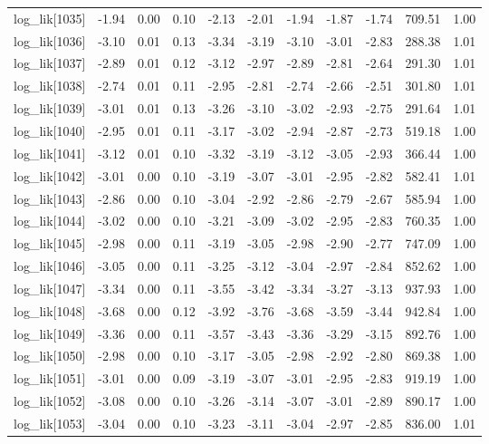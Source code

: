 \begin{table}[ht]
\begin{tabular}{rrrrrrrrrrr}
  log\_lik[1035] & -1.94 & 0.00 & 0.10 & -2.13 & -2.01 & -1.94 & -1.87 & -1.74 & 709.51 & 1.00 \\ 
  log\_lik[1036] & -3.10 & 0.01 & 0.13 & -3.34 & -3.19 & -3.10 & -3.01 & -2.83 & 288.38 & 1.01 \\ 
  log\_lik[1037] & -2.89 & 0.01 & 0.12 & -3.12 & -2.97 & -2.89 & -2.81 & -2.64 & 291.30 & 1.01 \\ 
  log\_lik[1038] & -2.74 & 0.01 & 0.11 & -2.95 & -2.81 & -2.74 & -2.66 & -2.51 & 301.80 & 1.01 \\ 
  log\_lik[1039] & -3.01 & 0.01 & 0.13 & -3.26 & -3.10 & -3.02 & -2.93 & -2.75 & 291.64 & 1.01 \\ 
  log\_lik[1040] & -2.95 & 0.01 & 0.11 & -3.17 & -3.02 & -2.94 & -2.87 & -2.73 & 519.18 & 1.00 \\ 
  log\_lik[1041] & -3.12 & 0.01 & 0.10 & -3.32 & -3.19 & -3.12 & -3.05 & -2.93 & 366.44 & 1.00 \\ 
  log\_lik[1042] & -3.01 & 0.00 & 0.10 & -3.19 & -3.07 & -3.01 & -2.95 & -2.82 & 582.41 & 1.01 \\ 
  log\_lik[1043] & -2.86 & 0.00 & 0.10 & -3.04 & -2.92 & -2.86 & -2.79 & -2.67 & 585.94 & 1.00 \\ 
  log\_lik[1044] & -3.02 & 0.00 & 0.10 & -3.21 & -3.09 & -3.02 & -2.95 & -2.83 & 760.35 & 1.00 \\ 
  log\_lik[1045] & -2.98 & 0.00 & 0.11 & -3.19 & -3.05 & -2.98 & -2.90 & -2.77 & 747.09 & 1.00 \\ 
  log\_lik[1046] & -3.05 & 0.00 & 0.11 & -3.25 & -3.12 & -3.04 & -2.97 & -2.84 & 852.62 & 1.00 \\ 
  log\_lik[1047] & -3.34 & 0.00 & 0.11 & -3.55 & -3.42 & -3.34 & -3.27 & -3.13 & 937.93 & 1.00 \\ 
  log\_lik[1048] & -3.68 & 0.00 & 0.12 & -3.92 & -3.76 & -3.68 & -3.59 & -3.44 & 942.84 & 1.00 \\ 
  log\_lik[1049] & -3.36 & 0.00 & 0.11 & -3.57 & -3.43 & -3.36 & -3.29 & -3.15 & 892.76 & 1.00 \\ 
  log\_lik[1050] & -2.98 & 0.00 & 0.10 & -3.17 & -3.05 & -2.98 & -2.92 & -2.80 & 869.38 & 1.00 \\ 
  log\_lik[1051] & -3.01 & 0.00 & 0.09 & -3.19 & -3.07 & -3.01 & -2.95 & -2.83 & 919.19 & 1.00 \\ 
  log\_lik[1052] & -3.08 & 0.00 & 0.10 & -3.26 & -3.14 & -3.07 & -3.01 & -2.89 & 890.17 & 1.00 \\ 
  log\_lik[1053] & -3.04 & 0.00 & 0.10 & -3.23 & -3.11 & -3.04 & -2.97 & -2.85 & 836.00 & 1.01 \\ 

\end{tabular}
\end{table}
